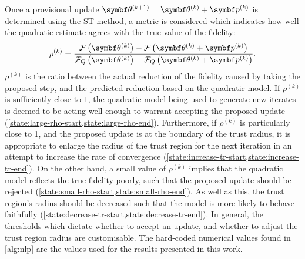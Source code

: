 Once a provisional update $\bthkplusone = \bthk + \bpk$ is determined using the
\ac{ST} method, a metric is considered which indicates how well the
quadratic estimate agrees with the true value of the fidelity:
\begin{equation}
    \rho^{(k)} = \frac
        {\Fthk - \Fthkpk}
        {\FQthk - \FQthkpk}.
\end{equation}
$\rho^{(k)}$ is the ratio between the actual reduction of the fidelity caused
by taking the proposed step, and the predicted reduction based on the quadratic
model. If $\rho^{(k)}$ is sufficiently close to $1$, the quadratic model being
used to generate new iterates is deemed to be acting well enough to warrant
accepting the proposed update
(\cref{state:large-rho-start,state:large-rho-end}).
Furthermore, if $\rho^{(k)}$ is particularly close to 1, and the proposed
update is at the boundary of the trust radius, it is appropriate to enlarge the
radius of the trust region for the next iteration in an attempt to increase the
rate of convergence
(\cref{state:increase-tr-start,state:increase-tr-end}).
On the other hand, a small value of $\rho^{(k)}$ implies that the
quadratic model reflects the true fidelity poorly, such that the proposed
update should be rejected
(\cref{state:small-rho-start,state:small-rho-end}).
As well as this, the trust region's radius should be
decreased such that the model is more likely to behave faithfully
(\cref{state:decrease-tr-start,state:decrease-tr-end}). In general, the
thresholds which dictate whether to accept an update, and whether to adjust the
trust region radius are customisable. The hard-coded numerical values found in
\cref{alg:nlp} are the values used for the results presented in this work.

